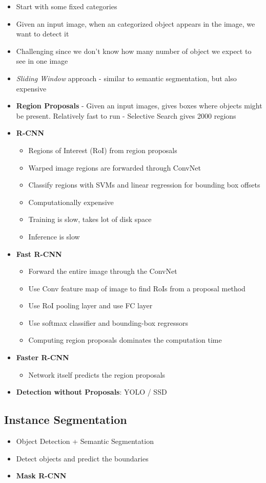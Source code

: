 \begin{itemize}
	\item Start with some fixed categories
	\item Given an input image, when an categorized object appears in the image, we want to detect it
	\item Challenging since we don't know how many number of object we expect to see in one image
	\item \textit{Sliding Window} approach - similar to semantic segmentation, but also expensive
	\item \textbf{Region Proposals} - Given an input images, gives boxes where objects might be present. Relatively fast to run - Selective Search gives 2000 regions
	\item \textbf{R-CNN}
	\begin{itemize}
		\item Regions of Interest (RoI) from region proposals
		\item Warped image regions are forwarded through ConvNet
		\item Classify regions with SVMs and linear regression for bounding box offsets
		\item Computationally expensive
		\item Training is slow, takes lot of disk space
		\item Inference is slow
	\end{itemize}
	\item \textbf{Fast R-CNN}
	\begin{itemize}
		\item Forward the entire image through the ConvNet
		\item Use Conv feature map of image to find RoIs from a proposal method
		\item Use RoI pooling layer and use FC layer
		\item Use softmax classifier and bounding-box regressors
		\item Computing region proposals dominates the computation time
	\end{itemize}
	\item \textbf{Faster R-CNN}
	\begin{itemize}
		\item Network itself predicts the region proposals
	\end{itemize}
	\item \textbf{Detection without Proposals}: YOLO / SSD
\end{itemize}

\subsection{Instance Segmentation}
\begin{itemize}
	\item Object Detection + Semantic Segmentation
	\item Detect objects and predict the boundaries
	\item \textbf{Mask R-CNN}
\end{itemize}